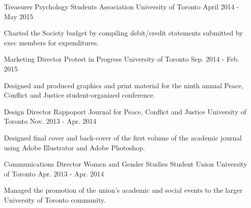 \begin{cventries}
  \cventry
    {Treasurer} %
    {Psychology Students Association} %
    {University of Toronto} %
    {April 2014 - May 2015} %
    {
      \begin{cvitems} %
        \item {Charted the Society budget by compiling debit/credit statements submitted by exec members for expenditures.}
      \end{cvitems}
    }

  \cventry
    {Marketing Director} %
    {Protest in Progress} %
    {University of Toronto} %
    {Sep. 2014 - Feb. 2015} %
    {
      \begin{cvitems} %
        \item {Designed and produced graphics and print material for the ninth annual Peace, Conflict and Justice student-organized conference.}
      \end{cvitems}
    }

  \cventry
    {Design Director} %
    {Rappoport Journal for Peace, Conflict and Justice} %
    {University of Toronto} %
    {Nov. 2013 - Apr. 2014} %
    {
      \begin{cvitems} %
        \item {Designed final cover and back-cover of the first volume of the academic journal using Adobe Illustrator and Adobe Photoshop.}
      \end{cvitems}
    }
    
   \cventry
   {Communications Director} %
   {Women and Gender Studies Student Union} %
    {University of Toronto} %
    {Apr. 2013 - Apr. 2014} %
    {
      \begin{cvitems} %
        \item {Managed the promotion of the union's academic and social events to the larger University of Toronto community.}
      \end{cvitems}
    }
 \linebreak   
    

\end{cventries}
